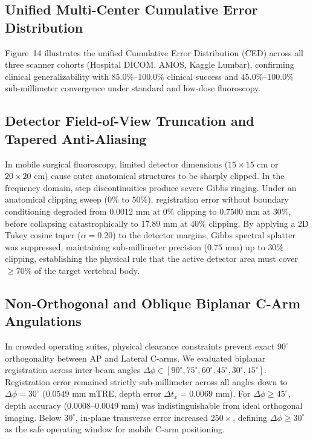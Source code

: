 \documentclass[journal,twocolumn]{IEEEtran}
\begin{document}
\subsection{Unified Multi-Center Cumulative Error Distribution}
Figure~14 illustrates the unified Cumulative Error Distribution (CED) across all three scanner cohorts (Hospital DICOM, AMOS, Kaggle Lumbar), confirming clinical generalizability with $85.0\%$--$100.0\%$ clinical success and $45.0\%$--$100.0\%$ sub-millimeter convergence under standard and low-dose fluoroscopy.

\subsection{Detector Field-of-View Truncation and Tapered Anti-Aliasing}
In mobile surgical fluoroscopy, limited detector dimensions ($15 \times 15\text{ cm}$ or $20 \times 20\text{ cm}$) cause outer anatomical structures to be sharply clipped. In the frequency domain, step discontinuities produce severe Gibbs ringing. Under an anatomical clipping sweep ($0\%$ to $50\%$), registration error without boundary conditioning degraded from $0.0012\text{ mm}$ at $0\%$ clipping to $0.7500\text{ mm}$ at $30\%$, before collapsing catastrophically to $17.89\text{ mm}$ at $40\%$ clipping. By applying a 2D Tukey cosine taper ($\alpha = 0.20$) to the detector margins, Gibbs spectral splatter was suppressed, maintaining sub-millimeter precision ($0.75\text{ mm}$) up to $30\%$ clipping, establishing the physical rule that the active detector area must cover $\ge 70\%$ of the target vertebral body.

\subsection{Non-Orthogonal and Oblique Biplanar C-Arm Angulations}
In crowded operating suites, physical clearance constraints prevent exact $90^\circ$ orthogonality between AP and Lateral C-arms. We evaluated biplanar registration across inter-beam angles $\Delta\phi \in [90^\circ, 75^\circ, 60^\circ, 45^\circ, 30^\circ, 15^\circ]$. Registration error remained strictly sub-millimeter across all angles down to $\Delta\phi = 30^\circ$ ($0.0549\text{ mm}$ mTRE, depth error $\Delta t_x = 0.0069\text{ mm}$). For $\Delta\phi \ge 45^\circ$, depth accuracy ($0.0008$--$0.0049\text{ mm}$) was indistinguishable from ideal orthogonal imaging. Below $30^\circ$, in-plane transverse error increased $250\times$, defining $\Delta\phi \ge 30^\circ$ as the safe operating window for mobile C-arm positioning.
\end{document}
